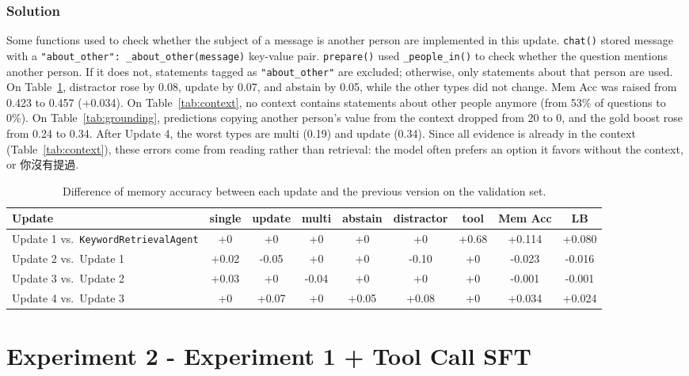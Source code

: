 \documentclass{article}
\begin{document}
\subsubsection{Solution}
Some functions used to check whether the subject of a message is another person are implemented in this update.
\texttt{chat()} stored message with a \texttt{"about\_other": \_about\_other(message)} key-value pair.
\texttt{prepare()} used \texttt{\_people\_in()} to check whether the question mentions another person.
If it does not, statements tagged as \texttt{"about\_other"} are excluded; otherwise, only statements about that person are used.
On Table~\ref{tab:diff}, distractor rose by 0.08, update by 0.07, and abstain by 0.05, while the other types did not change.
Mem Acc was raised from 0.423 to 0.457 (+0.034).
On Table~\ref{tab:context}, no context contains statements about other people anymore (from 53\% of questions to 0\%).
On Table~\ref{tab:grounding}, predictions copying another person's value from the context dropped from 20 to 0, and the gold boost rose from 0.24 to 0.34.
After Update 4, the worst types are multi (0.19) and update (0.34).
Since all evidence is already in the context (Table~\ref{tab:context}), these errors come from reading rather than retrieval: the model often prefers an option it favors without the context, or 你沒有提過.
\begin{table}[H]
    \centering
    \small
    \begin{tabular}{lcccccccc}
        \toprule
        Update & single & update & multi & abstain & distractor & tool & Mem Acc & LB \\
        \midrule
        Update 1 vs.\ \texttt{KeywordRetrievalAgent} & +0 & +0 & +0 & +0 & +0 & +0.68 & +0.114 & +0.080 \\
        Update 2 vs.\ Update 1 & +0.02 & -0.05 & +0 & +0 & -0.10 & +0 & -0.023 & -0.016 \\
        Update 3 vs.\ Update 2 & +0.03 & +0 & -0.04 & +0 & +0 & +0 & -0.001 & -0.001 \\
        Update 4 vs.\ Update 3 & +0 & +0.07 & +0 & +0.05 & +0.08 & +0 & +0.034 & +0.024 \\
        \bottomrule
    \end{tabular}
    \caption{Difference of memory accuracy between each update and the previous version on the validation set.}
    \label{tab:diff}
\end{table}
\section{Experiment 2 - Experiment 1 + Tool Call SFT}
\end{document}
